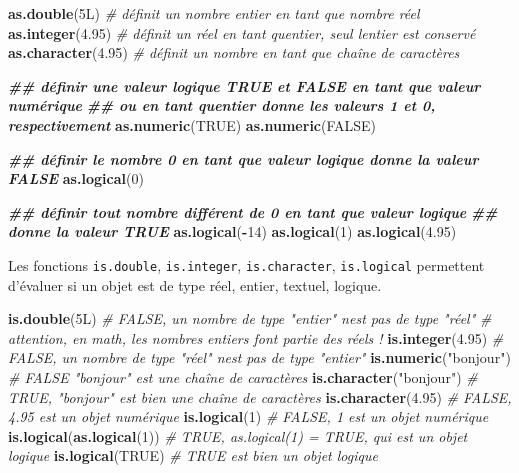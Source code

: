 \documentclass[
]{book}
\newenvironment{Shaded}{\begin{snugshade}}{\end{snugshade}}
\newcommand{\CommentTok}[1]{\textcolor[rgb]{0.56,0.35,0.01}{\textit{#1}}}
\newcommand{\ConstantTok}[1]{\textcolor[rgb]{0.56,0.35,0.01}{#1}}
\newcommand{\DataTypeTok}[1]{\textcolor[rgb]{0.13,0.29,0.53}{#1}}
\newcommand{\DecValTok}[1]{\textcolor[rgb]{0.00,0.00,0.81}{#1}}
\newcommand{\DocumentationTok}[1]{\textcolor[rgb]{0.56,0.35,0.01}{\textbf{\textit{#1}}}}
\newcommand{\FloatTok}[1]{\textcolor[rgb]{0.00,0.00,0.81}{#1}}
\newcommand{\FunctionTok}[1]{\textcolor[rgb]{0.13,0.29,0.53}{\textbf{#1}}}
\newcommand{\NormalTok}[1]{#1}
\newcommand{\SpecialCharTok}[1]{\textcolor[rgb]{0.81,0.36,0.00}{\textbf{#1}}}
\newcommand{\StringTok}[1]{\textcolor[rgb]{0.31,0.60,0.02}{#1}}
\begin{document}
\begin{Shaded}
\begin{Highlighting}[]
\FunctionTok{as.double}\NormalTok{(}\DecValTok{5}\DataTypeTok{L}\NormalTok{) }\CommentTok{\# définit un nombre entier en tant que nombre réel}
\FunctionTok{as.integer}\NormalTok{(}\FloatTok{4.95}\NormalTok{) }\CommentTok{\# définit un réel en tant qu\textquotesingle{}entier, seul l\textquotesingle{}entier est conservé}
\FunctionTok{as.character}\NormalTok{(}\FloatTok{4.95}\NormalTok{) }\CommentTok{\# définit un nombre en tant que chaîne de caractères}

\DocumentationTok{\#\# définir une valeur logique TRUE et FALSE en tant que valeur numérique }
\DocumentationTok{\#\# ou en tant qu\textquotesingle{}entier donne les valeurs 1 et 0, respectivement}
\FunctionTok{as.numeric}\NormalTok{(}\ConstantTok{TRUE}\NormalTok{) }
\FunctionTok{as.numeric}\NormalTok{(}\ConstantTok{FALSE}\NormalTok{) }

\DocumentationTok{\#\# définir le nombre 0 en tant que valeur logique donne la valeur FALSE}
\FunctionTok{as.logical}\NormalTok{(}\DecValTok{0}\NormalTok{)}

\DocumentationTok{\#\# définir tout nombre différent de 0 en tant que valeur logique }
\DocumentationTok{\#\# donne la valeur TRUE}
\FunctionTok{as.logical}\NormalTok{(}\SpecialCharTok{{-}}\DecValTok{14}\NormalTok{)}
\FunctionTok{as.logical}\NormalTok{(}\DecValTok{1}\NormalTok{)}
\FunctionTok{as.logical}\NormalTok{(}\FloatTok{4.95}\NormalTok{)}
\end{Highlighting}
\end{Shaded}

Les fonctions \texttt{is.double}, \texttt{is.integer}, \texttt{is.character}, \texttt{is.logical} permettent d'évaluer si un objet est de type réel, entier, textuel, logique.

\begin{Shaded}
\begin{Highlighting}[]
\FunctionTok{is.double}\NormalTok{(}\DecValTok{5}\DataTypeTok{L}\NormalTok{) }\CommentTok{\# FALSE, un nombre de type "entier" n\textquotesingle{}est pas de type "réel"}
              \CommentTok{\# attention, en math, les nombres entiers font partie des réels !}
\FunctionTok{is.integer}\NormalTok{(}\FloatTok{4.95}\NormalTok{) }\CommentTok{\# FALSE, un nombre de type "réel" n\textquotesingle{}est pas de type "entier"}
\FunctionTok{is.numeric}\NormalTok{(}\StringTok{"bonjour"}\NormalTok{) }\CommentTok{\# FALSE "bonjour" est une chaîne de caractères}
\FunctionTok{is.character}\NormalTok{(}\StringTok{"bonjour"}\NormalTok{) }\CommentTok{\# TRUE, "bonjour" est bien une chaîne de caractères}
\FunctionTok{is.character}\NormalTok{(}\FloatTok{4.95}\NormalTok{) }\CommentTok{\# FALSE, 4.95 est un objet numérique}
\FunctionTok{is.logical}\NormalTok{(}\DecValTok{1}\NormalTok{) }\CommentTok{\# FALSE, 1 est un objet numérique}
\FunctionTok{is.logical}\NormalTok{(}\FunctionTok{as.logical}\NormalTok{(}\DecValTok{1}\NormalTok{)) }\CommentTok{\# TRUE, as.logical(1) = TRUE, qui est un objet logique}
\FunctionTok{is.logical}\NormalTok{(}\ConstantTok{TRUE}\NormalTok{) }\CommentTok{\# TRUE est bien un objet logique}
\end{Highlighting}
\end{Shaded}
\end{document}
